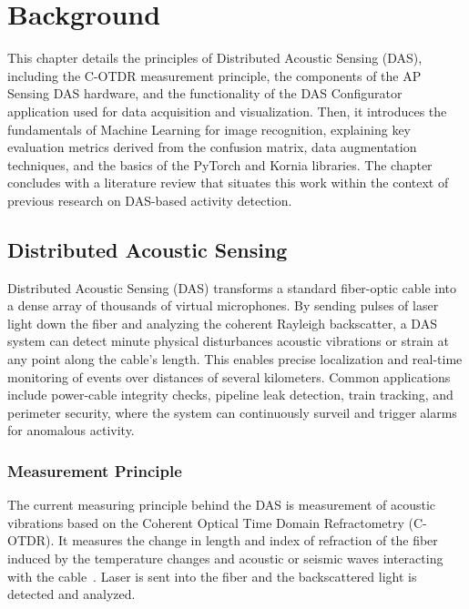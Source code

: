 %
%
%
\chapter{Background}
This chapter details the principles of Distributed Acoustic Sensing (DAS), including the C-OTDR measurement principle, the components of the AP Sensing DAS hardware, and the functionality of the DAS Configurator application used for data acquisition and visualization. Then, it introduces the fundamentals of Machine Learning for image recognition, explaining key evaluation metrics derived from the confusion matrix, data augmentation techniques, and the basics of the PyTorch and Kornia libraries. The chapter concludes with a literature review that situates this work within the context of previous research on DAS-based activity detection.

\section{Distributed Acoustic Sensing}

Distributed Acoustic Sensing (DAS) transforms a standard fiber-optic cable into a dense array of thousands of virtual microphones. By sending pulses of laser light down the fiber and analyzing the coherent Rayleigh backscatter, a DAS system can detect minute physical disturbances acoustic vibrations or strain at any point along the cable's length. This enables precise localization and real-time monitoring of events over distances of several kilometers. Common applications include power-cable integrity checks, pipeline leak detection, train tracking, and perimeter security, where the system can continuously surveil and trigger alarms for anomalous activity. 

\subsection{Measurement Principle}

The current measuring principle behind the DAS is measurement of acoustic vibrations based on the Coherent Optical Time Domain Refractometry (C-OTDR). It measures the change in length and index of refraction of the fiber induced by the temperature changes and acoustic or seismic waves interacting with the cable~\cite{duckworth}. Laser is sent into the fiber and the backscattered light is detected and analyzed. 

